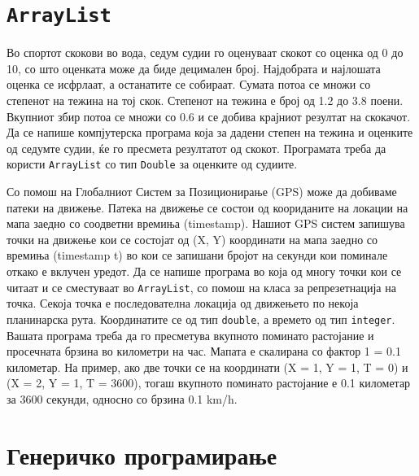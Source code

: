 

\lfoot{}
\cfoot{\thepage}
\rfoot{}
\usepackage{fancyvrb}
\usepackage{xcolor}
\usepackage{textcomp}


\begin{questions}

\section{\texttt{ArrayList}}

\question
Во спортот скокови во вода, седум судии го оценуваат скокот со оценка од 0 до
10, со што оценката може да биде децимален број. Најдобрата и најлошата оценка
се исфрлаат, а останатите се собираат. Сумата потоа се множи со степенот на
тежина на тој скок. Степенот на тежина е број од 1.2 до 3.8 поени. Вкупниот збир
потоа се множи со 0.6 и се добива крајниот резултат на скокачот. Да се напише
компјутерска програма која за дадени степен на тежина и оценките од
седумте судии, ќе го пресмета резултатот од скокот. Програмата треба да користи
\texttt{ArrayList} со тип \texttt{Double} за оценките од судиите.



\question

Со помош на Глобалниот Систем за Позиционирање (GPS) може да добиваме патеки на
движење. Патека на движење се состои од коориданите на локации на мапа заедно со
соодветни времиња (timestamp). Нашиот GPS систем запишува точки на движење кои
се состојат од (X, Y) координати на мапа заедно со времиња (timestamp t) во кои
се запишани бројот на секунди кои поминале откако е вклучен уредот. Да се напише
програма во која од многу точки кои се читаат и се сместуваат во
\texttt{ArrayList}, со помош на класа за репрезетнација на точка. Секоја точка е
последователна локација од движењето по некоја планинарска рута. Координатите се
од тип \texttt{double}, а времето од тип \texttt{integer}. Вашата програма треба
да го пресметува вкупното поминато растојание и просечната брзина во километри
на час. Мапата е скалирана со фактор 1 = 0.1 километар. На пример, ако две точки
се на координати (X = 1, Y = 1, T = 0) и (X = 2, Y = 1, T = 3600), тогаш
вкупното поминато растојание е 0.1 километар за 3600 секунди, односно со брзина
0.1 km/h.




\section{Генеричко програмирање}


\end{questions}
